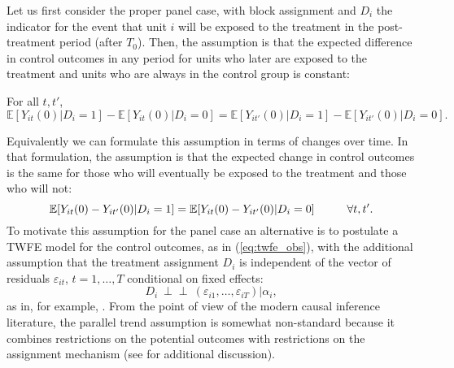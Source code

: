 \documentclass[letterpaper,12pt,leqno]{article}
\newcommand{\indep}{\perp\!\!\!\perp}
\newcommand{\mme}{{\mathbb{E}}}
\begin{document}
Let us first consider the proper panel case, with block assignment and  $D_i$ the indicator for the event that unit $i$ will be exposed to the treatment in the post-treatment period (after $T_0$).
Then, the assumption is that the expected  difference  in control outcomes in any period for  units who later are exposed to the treatment and units who are always in the control group is constant:
\begin{assumption}
For all  $t,t'$,
\begin{equation}
\mme[Y_{it}(0)|D_i=1]-\mme[Y_{it}(0)|D_i=0] = \mme[Y_{it'}(0)|D_i=1]-\mme[Y_{it'}(0)|D_i=0] . \end{equation}
\end{assumption}
Equivalently we can formulate this assumption in terms of changes over time. In that formulation, the assumption is that the expected change in control outcomes is the same for those who will eventually be exposed to the treatment and those who will not:
\[
\mme [Y_{it}(0)-Y_{it'}(0)|D_i=1] = \mme [Y_{it}(0)-Y_{it'}(0)|D_i=0] \hskip1cm \forall t,t'. \]
To motivate this assumption for the panel case an alternative is to postulate a TWFE model for the control outcomes, as in (\ref{eq:twfe_obs}),
with the additional assumption that the treatment assignment $D_{i}$ is independent of the vector of residuals $\varepsilon_{it}$, $t=1,\ldots,T$ conditional on fixed effects:
\[ D_{i}\ \indep\ (\varepsilon_{i1},\ldots,\varepsilon_{iT}) | \alpha_i,\]
as in, for example,  \citep{arellano2003panel}.
From the point of view of the modern causal inference literature, the parallel trend assumption is somewhat non-standard because it combines restrictions on the potential outcomes with restrictions on the assignment mechanism (see \cite{ghanem2022selection, roth2023parallel} for  additional discussion).
\end{document}
